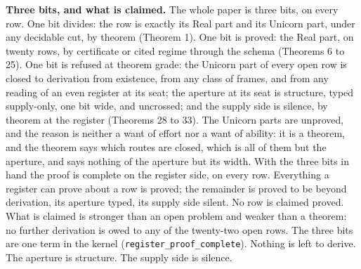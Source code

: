 \documentclass[10pt]{article}
\begin{document}
\textbf{Three bits, and what is claimed.} The whole paper is three bits,
on every row. One bit divides: the row is exactly its Real part and its
Unicorn part, under any decidable cut, by theorem (Theorem 1). One bit
is proved: the Real part, on twenty rows, by certificate or cited regime
through the schema (Theorems 6 to 25). One bit is refused at theorem
grade: the Unicorn part of every open row is closed to derivation from
existence, from any class of frames, and from any reading of an even
register at its seat; the aperture at its seat is structure, typed
supply-only, one bit wide, and uncrossed; and the supply side is
silence, by theorem at the register (Theorems 28 to 33). The Unicorn
parts are unproved, and the reason is neither a want of effort nor a
want of ability: it is a theorem, and the theorem says which routes are
closed, which is all of them but the aperture, and says nothing of the
aperture but its width. With the three bits in hand the proof is
complete on the register side, on every row. Everything a register can
prove about a row is proved; the remainder is proved to be beyond
derivation, its aperture typed, its supply side silent. No row is
claimed proved. What is claimed is stronger than an open problem and
weaker than a theorem: no further derivation is owed to any of the
twenty-two open rows. The three bits are one term in the kernel
(\texttt{register\_proof\_complete}). Nothing is left to derive. The
aperture is structure. The supply side is silence.
\end{document}
